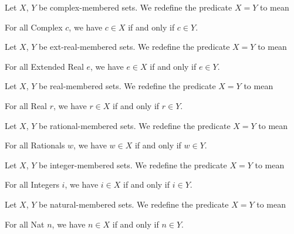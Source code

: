 \documentclass{article}
\begin{document}
\begin{definition}
Let $X$, $Y$ be complex-membered sets.
We redefine the predicate $X=Y$ to mean
\begin{defn}
\item For all Complex $c$, we have $c\in X$ if and only if $c\in Y$.
\end{defn}
\end{definition}

\begin{definition}
Let $X$, $Y$ be ext-real-membered sets.
We redefine the predicate $X=Y$ to mean
\begin{defn}
\item For all Extended Real $e$, we have $e\in X$ if and only if $e\in Y$.
\end{defn}
\end{definition}

\begin{definition}
Let $X$, $Y$ be real-membered sets.
We redefine the predicate $X=Y$ to mean
\begin{defn}
\item For all Real $r$, we have $r\in X$ if and only if $r\in Y$.
\end{defn}
\end{definition}

\begin{definition}
Let $X$, $Y$ be rational-membered sets.
We redefine the predicate $X=Y$ to mean
\begin{defn}
\item For all Rationals $w$, we have $w\in X$ if and only if $w\in Y$.
\end{defn}
\end{definition}

\begin{definition}
Let $X$, $Y$ be integer-membered sets.
We redefine the predicate $X=Y$ to mean
\begin{defn}
\item For all Integers $i$, we have $i\in X$ if and only if $i\in Y$.
\end{defn}
\end{definition}

\begin{definition}
Let $X$, $Y$ be natural-membered sets.
We redefine the predicate $X=Y$ to mean
\begin{defn}
\item For all Nat $n$, we have $n\in X$ if and only if $n\in Y$.
\end{defn}
\end{definition}
\end{document}
